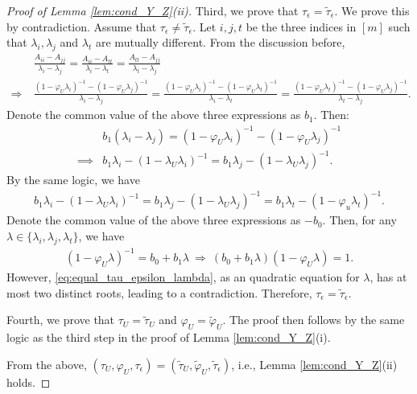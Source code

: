 \documentclass[11pt]{article}
\theoremstyle{definition}
\theoremstyle{remark}
\begin{document}
\begin{proof}[Proof of Lemma \ref{lem:cond_Y_Z}(ii)]
Third, we prove that $\tau_{\epsilon} = \tilde{\tau}_{\epsilon}$. 
We prove this by contradiction. 
Assume that $\tau_{\epsilon} \ne \tilde{\tau}_{\epsilon}$. 
Let $i,j,t$ be the three indices in $[m]$ such that $\lambda_i, \lambda_j$ and $\lambda_t$ are mutually different. 
From the discussion before, 
\begin{align*}
    & \frac{A_{ii}-A_{jj}}{\lambda_i -\lambda_j} = \frac{A_{ii} - A_{tt}}{\lambda_i-\lambda_t}
    = 
    \frac{A_{tt}-A_{jj}}{\lambda_t -\lambda_j} \\
    \Longrightarrow \ & 
    \frac{(1- \varphi_U \lambda_i)^{-1} - (1- \varphi_U \lambda_j)^{-1}}{\lambda_i -\lambda_j}
    = 
    \frac{(1- \varphi_U \lambda_i)^{-1} - (1- \varphi_U \lambda_t)^{-1}}{\lambda_i -\lambda_t}
    = 
    \frac{(1- \varphi_U \lambda_t)^{-1} - (1- \varphi_U \lambda_j)^{-1}}{\lambda_t -\lambda_j}.
\end{align*}
Denote the common value of the above three expressions as $b_1$. Then:
\begin{align*} &b_1(\lambda_i - \lambda_j) = (1-\varphi_U \lambda_i)^{-1} - (1-\varphi_U \lambda_j)^{-1}\\
\implies & b_1 \lambda_i - (1-\lambda_U \lambda_i)^{-1} = b_1\lambda_j - (1-\lambda_U \lambda_j)^{-1}.
\end{align*} 
By the same logic, we have 
\begin{align*}
    b_1 \lambda_i - (1-\lambda_U \lambda_i)^{-1} = b_1\lambda_j - (1-\lambda_U \lambda_j)^{-1}
    = b_1\lambda_t - (1- \varphi_u \lambda_t)^{-1}. 
\end{align*}
Denote the common value of the above three expressions as $-b_0$.
Then, for any $\lambda \in \{\lambda_i, \lambda_j, \lambda_t\}$, we have 
\begin{align}\label{eq:equal_tau_epsilon_lambda}
    (1- \varphi_U \lambda)^{-1} = b_0 + b_1 \lambda
    \ \Longrightarrow \ 
    (b_0 + b_1 \lambda)  (1- \varphi_U \lambda) = 1. 
\end{align}
However, \eqref{eq:equal_tau_epsilon_lambda}, as an quadratic equation for $\lambda$, has at most two distinct roots, leading to a contradiction. 
Therefore, $\tau_{\epsilon} = \tilde{\tau}_{\epsilon}$. 

Fourth, we prove that $\tau_U = \tilde{\tau}_U$ and $\varphi_U = \tilde{\varphi}_U$. 
The proof then follows by the same logic as the third step in the proof of Lemma \ref{lem:cond_Y_Z}(i). 

From the above, $(\tau_U, \varphi_U, \tau_{\epsilon}) = (\tilde{\tau}_U, \tilde{\varphi}_U, \tilde{\tau}_{\epsilon})$, i.e., Lemma \ref{lem:cond_Y_Z}(ii) holds. 
\end{proof}
\end{document}
